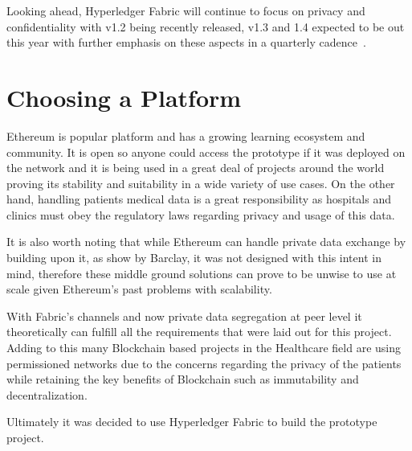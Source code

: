 Looking ahead, Hyperledger Fabric will continue to focus on privacy and
confidentiality with v1.2 being recently released, v1.3 and 1.4 expected to be
out this year with further emphasis on these aspects in a quarterly
cadence~\cite{hyperledgerRoadmap2018}.

\section{Choosing a Platform}\label{choosePlatform}

Ethereum is popular platform and has a growing learning ecosystem and
community. It is open so anyone could access the prototype if it was deployed
on the network and it is being used in a great deal of projects around the
world proving its stability and suitability in a wide variety of use cases. On
the other hand, handling patients medical data is a great responsibility as
hospitals and clinics must obey the regulatory laws regarding privacy and usage
of this data.

It is also worth noting that while Ethereum can handle private data exchange by
building upon it, as show by Barclay, it was not designed with this intent in
mind, therefore these middle ground solutions can prove to be unwise to use at
scale given Ethereum's past problems with scalability.

With Fabric's channels and now private data segregation at peer level it
theoretically can fulfill all the requirements that were laid out for this
project. Adding to this many Blockchain based projects in the Healthcare field
are using permissioned networks due to the concerns regarding the privacy of
the patients while retaining the key benefits of Blockchain such as
immutability and decentralization.

Ultimately it was decided to use Hyperledger Fabric to build the prototype
project.
